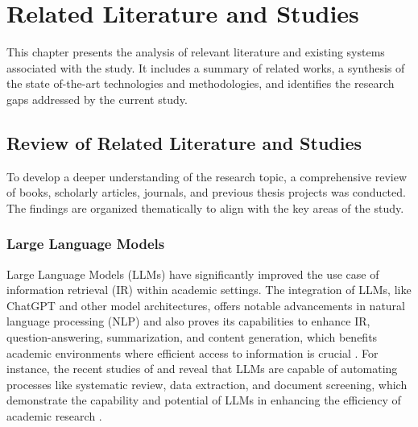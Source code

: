\chapter{Related Literature and Studies}
\begin{refsection}

This chapter presents the analysis of relevant literature and existing systems associated with the study. It includes a summary of related works, a synthesis of the state of-the-art technologies and methodologies, and identifies the research gaps addressed by the current study.

\section{Review of Related Literature and Studies}
To develop a deeper understanding of the research topic, a comprehensive review of books, scholarly articles, journals, and previous thesis projects was conducted. The findings are organized thematically to align with the key areas of the study.

\subsection{Large Language Models}

\hspace{1cm}Large Language Models (LLMs) have significantly improved the use case of information retrieval (IR) within academic settings. The integration of LLMs, like ChatGPT and other model architectures, offers notable advancements in natural language processing (NLP) and also proves its capabilities to enhance IR, question-answering, summarization, and content generation, which benefits academic environments where efficient access to information is crucial \cite{yalamanchili2024quality} \cite{yang2023large}. For instance, the recent studies of \citeauthor{khraisha2024can} \citeyear{khraisha2024can} and \citeauthor{gartlehner2023data} \citeyear{gartlehner2023data} reveal that LLMs are capable of automating processes like systematic review, data extraction, and document screening, which demonstrate the capability and potential of LLMs in enhancing the efficiency of academic research \cite{khraisha2024can}  \cite{gartlehner2023data}.


\end{refsection}
